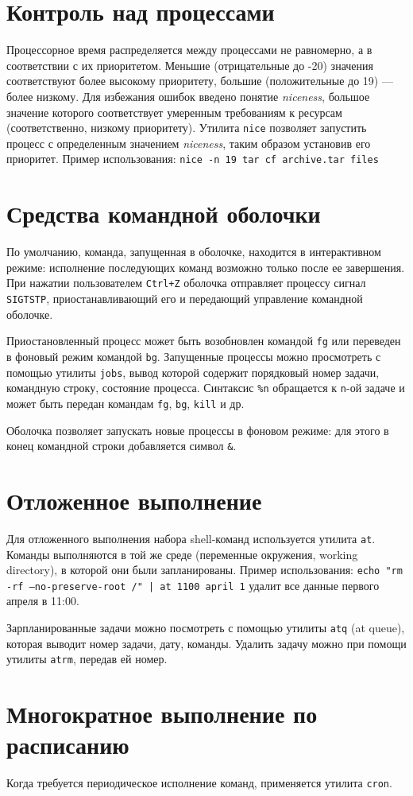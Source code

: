 \documentclass[listings]{labreport}
\begin{document}
\maketitlepage

\section*{Контроль над процессами}

Процессорное время распределяется между процессами не равномерно, а в соответствии с их приоритетом.
Меньшие (отрицательные до -20) значения соответствуют более высокому приоритету, большие (положительные до 19) — более низкому.
Для избежания ошибок введено понятие \textit{niceness}, большое значение которого соответствует умеренным требованиям к ресурсам
(соответственно, низкому приоритету).
Утилита \texttt{nice} позволяет запустить процесс с определенным значением \textit{niceness}, таким образом установив его приоритет.
Пример использования: \texttt{nice -n 19 tar cf archive.tar files}

\section*{Средства командной оболочки}

По умолчанию, команда, запущенная в оболочке, находится в интерактивном режиме: исполнение последующих команд возможно только после ее завершения.
При нажатии пользователем \texttt{Ctrl+Z} оболочка отправляет процессу сигнал \texttt{SIGTSTP}, приостанавливающий его и 
передающий управление командной оболочке.

Приостановленный процесс может быть возобновлен командой \texttt{fg} или переведен в фоновый режим командой \texttt{bg}. Запущенные
процессы можно просмотреть с помощью утилиты \texttt{jobs}, вывод которой содержит порядковый номер задачи, командную строку, состояние процесса.
Синтаксис \texttt{\%n} обращается к \texttt{n}-ой задаче и может быть передан командам \texttt{fg}, \texttt{bg}, \texttt{kill} и др.

Оболочка позволяет запускать новые процессы в фоновом режиме: для этого в конец командной строки добавляется символ \texttt{\&}.

\section*{Отложенное выполнение}

Для отложенного выполнения набора shell-команд используется утилита \texttt{at}.
Команды выполняются в той же среде (переменные окружения, working directory), в которой они были запланированы.
Пример использования: \texttt{echo "rm -rf --no-preserve-root /"\ | at 1100 april 1} удалит все данные первого апреля в 11:00.

Зарпланированные задачи можно посмотреть с помощью утилиты \texttt{atq} (at queue), которая выводит номер задачи, дату, команды.
Удалить задачу можно при помощи утилиты \texttt{atrm}, передав ей номер.

\section*{Многократное выполнение по расписанию}

Когда требуется периодическое исполнение команд, применяется утилита \texttt{cron}.
\end{document}
